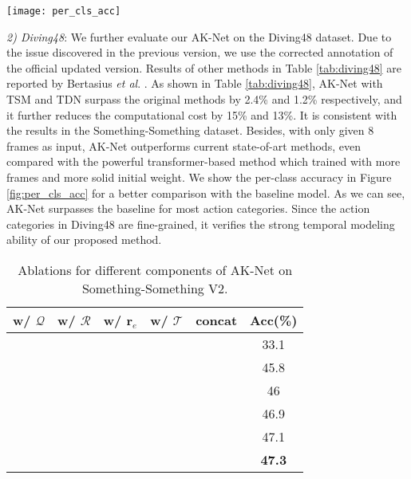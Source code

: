 \documentclass[journal]{IEEEtran}
\newcommand{\etal}{\textit{et al}. }
\begin{document}
\begin{figure*}
    \centering
    \texttt{[image: per\_cls\_acc]}
    \caption{Per class accuracy on Diving48 dataset.
    Because the original action labels annotated by terminologies are not easy to understand, we use the template `act:\#' to replace them for simplicity.}
    \label{fig:per_cls_acc}
\end{figure*}

\textit{2) Diving48}:
We further evaluate our AK-Net on the Diving48 dataset.
Due to the issue discovered in the previous version, we use the corrected annotation of the official updated version.
Results of other methods in Table \ref{tab:diving48} are reported by Bertasius \etal \cite{bertasius2021space}.
As shown in Table \ref{tab:diving48}, AK-Net with TSM and TDN surpass the original methods by 2.4\% and 1.2\% respectively, and it further reduces the computational cost by 15\% and 13\%.
It is consistent with the results in the Something-Something dataset.
Besides, with only given 8 frames as input, AK-Net outperforms current state-of-art methods, even compared with the powerful transformer-based method which trained with more frames and more solid initial weight.
We show the per-class accuracy in Figure \ref{fig:per_cls_acc} for a better comparison with the baseline model.
As we can see, AK-Net surpasses the baseline for most action categories.
Since the action categories in Diving48 are fine-grained, it verifies the strong temporal modeling ability of our proposed method.

\begin{table}[ht]
	\centering
	\caption{Ablations for different components of AK-Net on Something-Something V2.}
	\label{tab:ablation_component}
	\begin{tabular}{cccccc}
		\hline
		w/ $\mathcal{Q}$   & w/ $\mathcal{R}$ & w/ $\mathbf{r}_e$ & w/ $\mathcal{T}$ & concat & Acc(\%) \\ \hline
		\checkmark &    &    &  & & 33.1    \\
		\checkmark & \checkmark  & & & & 45.8    \\
		\checkmark & \checkmark  & \checkmark & & & 46    \\ 
		\checkmark & \checkmark  &  & \checkmark & & 46.9    \\ 
		\checkmark & \checkmark  &  & \checkmark & \checkmark & 47.1    \\ 
		\checkmark & \checkmark  & \checkmark & \checkmark  & \checkmark & \textbf{47.3}    \\ \hline
	\end{tabular}
\end{table}
\end{document}
